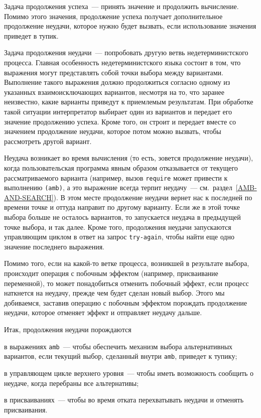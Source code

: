 Задача продолжения успеха~--- принять значение и
продолжить вычисление.  Помимо этого значения, продолжение успеха
получает дополнительное продолжение неудачи, которое нужно будет вызвать,
если использование значения приведет в тупик.

Задача продолжения неудачи~--- попробовать другую ветвь
недетерминистского процесса.  Главная особенность недетерминистского языка
состоит в том, что выражения могут представлять собой точки выбора между
вариантами.  Выполнение такого выражения должно продолжиться согласно
одному из указанных взаимоисключающих вариантов, несмотря на то, что
заранее неизвестно, какие варианты приведут к приемлемым результатам.
При обработке такой ситуации интерпретатор выбирает один из
вариантов и передает его значение продолжению успеха.  Кроме того,
он строит и передает вместе со значением продолжение неудачи, которое
потом можно вызвать, чтобы рассмотреть другой вариант.

Неудача возникает во время вычисления (то есть, зовется
продолжение неудачи), когда пользовательская программа явным образом
отказывается от
текущего рассматриваемого варианта (например, вызов
{\tt require} может привести к выполнению {\tt (amb)}, а
это выражение всегда терпит неудачу~--- 
см.~раздел~\ref{AMB-AND-SEARCH}).  В этом месте продолжение неудачи
вернет нас к последней по времени точке и оттуда направит по другому
варианту.  Если же в этой точке выбора больше не осталось вариантов, то
запускается неудача в предыдущей точке выбора, и так далее.  Кроме
того, продолжения неудачи запускаются управляющим циклом в ответ на
запрос {\tt try-again}, чтобы найти еще одно значение последнего
выражения.

Помимо того, если на какой-то ветке процесса,
возникшей в результате выбора, происходит операция с побочным эффектом
(например, присваивание переменной), то может понадобиться отменить
побочный эффект, если процесс наткнется на неудачу, прежде чем
будет сделан новый выбор. Этого мы добиваемся, заставив операцию с
побочным эффектом порождать продолжение неудачи, которое отменяет
эффект и отправляет неудачу дальше.

Итак, продолжения неудачи порождаются

\begin{plainlist}
\item
в выражениях {\tt amb}~--- чтобы обеспечить
механизм выбора альтернативных вариантов, если текущий выбор,
сделанный внутри {\tt amb}, приведет к тупику;

\item
в управляющем цикле верхнего уровня~--- чтобы иметь
возможность сообщить о неудаче, когда перебраны все альтернативы;

\item
в присваиваниях~--- чтобы во время отката перехватывать неудачи и
отменять присваивания.
\end{plainlist}

